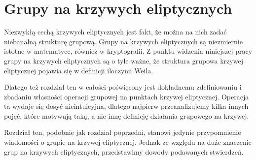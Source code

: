 \chapter{Grupy na krzywych eliptycznych}

Niezwykłą cechą krzywych eliptycznych jest fakt,
że można na nich zadać niebanalną strukturę grupową.
Grupy na krzywych eliptycznych
są niezmiernie istotne w matematyce,
również w kryptografii.
Z punktu widzenia niniejszej pracy
grupy na krzywych eliptycznych są o tyle ważne,
że struktura grupowa krzywej eliptycznej
pojawia się w definicji iloczynu Weila.

Dlatego też rozdział ten w całości poświęcony jest
dokładnemu zdefiniowaniu i zbadaniu własności
operacji grupowej na punktach krzywej eliptycznej.
Operacja ta wydaje się dosyć nieintuicyjna,
dlatego najpierw przeanalizujemy kilka innych pojęć,
które motywują taką, a nie innę
definicję działania grupowego na krzywej.

Rozdział ten, podobnie jak rozdział poprzedni,
stanowi jedynie przypomnienie wiadomości
o grupie na krzywej eliptycznej.
Jednak ze względu na duże znaczenie grup na krzywych eliptycznych,
przedstawimy dowody podawanych stwierdzeń.








